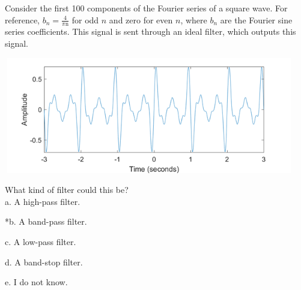 
Consider the first 100 components of the Fourier series of a square wave. For reference, \(b_{n} = \frac{4}{\pi\text{n}}\) for odd \(n\) and zero for even \(n\), where \(b_n\) are the Fourier sine series coefficients. This signal is sent through an ideal filter, which outputs this signal.

\includegraphics[width=5in,height=2in]{../../Images/FilteringQ3.png}

What kind of filter could this be?\\

a. A high-pass filter.

*b. A band-pass filter.

c. A low-pass filter.

d. A band-stop filter.

e. I do not know.\\
